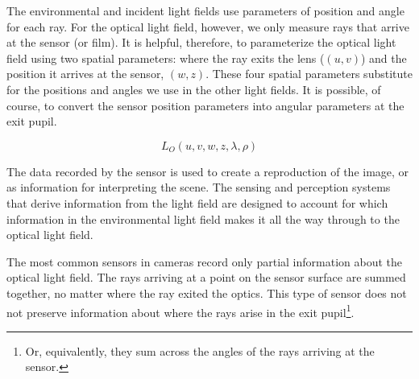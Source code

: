 \documentclass[
  letterpaper,
]{book}
\begin{document}
\begin{figure}



\end{figure}%

The environmental and incident light fields use parameters of position
and angle for each ray. For the optical light field, however, we only
measure rays that arrive at the sensor (or film). It is helpful,
therefore, to parameterize the optical light field using two spatial
parameters: where the ray exits the lens (\((u,v)\)) and the position it
arrives at the sensor, \((w,z)\). These four spatial parameters
substitute for the positions and angles we use in the other light
fields. It is possible, of course, to convert the sensor position
parameters into angular parameters at the exit pupil.

\[L_O(u,v,w,z,\lambda,\rho)\]

The data recorded by the sensor is used to create a reproduction of the
image, or as information for interpreting the scene. The sensing and
perception systems that derive information from the light field are
designed to account for which information in the environmental light
field makes it all the way through to the optical light field.

The most common sensors in cameras record only partial information about
the optical light field. The rays arriving at a point on the sensor
surface are summed together, no matter where the ray exited the optics.
This type of sensor does not not preserve information about where the
rays arise in the exit pupil\footnote{Or, equivalently, they sum across
  the angles of the rays arriving at the sensor.}.
\end{document}
